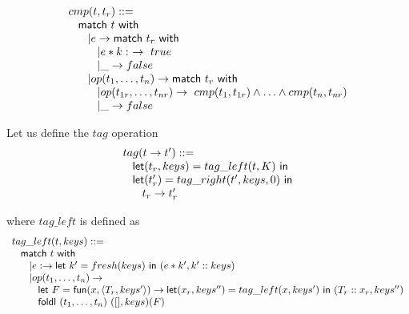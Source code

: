 \documentclass{article}[12pt,a4paper]
\theoremstyle{definition}
\begin{document}
\[
  \begin{array}{l}
  cmp(t,t_r) ::=\\
    \hspace{2ex}\mathsf{match}~t~\mathsf{with}\\
    \hspace{4ex}| e \rightarrow \mathsf{match}~t_r~\mathsf{with}\\
    \hspace{6ex}| e*k: ~\rightarrow~true\\
    \hspace{6ex}| \_ \rightarrow false\\
    \hspace{4ex}| op(t_1,\ldots,t_n) \rightarrow \mathsf{match}~t_r~\mathsf{with}\\
    \hspace{6ex}| op(t_{1r},\ldots,t_{nr})\rightarrow~cmp(t_1,t_{1r}) \wedge\ldots\wedge cmp(t_n,t_{nr})\\
    \hspace{6ex}| \_ \rightarrow false

  \end{array}
\]

Let us define the $tag$ operation
\[
  \begin{array}{l}
    tag(t\rightarrow t') ::=\\
    \hspace{2ex}\mathsf{let} (t_r, keys) = tag\_left(t, K)~\mathsf{in}\\
    \hspace{2ex}\mathsf{let} (t_r') = tag\_right(t', keys, 0)~\mathsf{in}\\
    \hspace{4ex}t_r \rightarrow t'_r
  \end{array}
\]

where $tag\_left$ is defined as
\[
  \begin{array}{l}
    tag\_left(t, keys) ::=\\
    \hspace{2ex}\mathsf{match}~t~\mathsf{with}\\
    \hspace{4ex}| e: \rightarrow \mathsf{let}~k'=fresh(keys)~\mathsf{in}~
    (e*k',k'::keys)\\
    \hspace{4ex}| op(t_1,\ldots,t_n) \rightarrow \\
    \hspace{6ex} \mathsf{let}~F=\mathsf{fun}(x,\langle T_r, keys'\rangle) \rightarrow \mathsf{let}(x_r,keys'')=tag\_left(x, keys')~\mathsf{in}~(T_r::x_r, keys'')\\
    \hspace{6ex} \mathsf{foldl}~(t_1,\ldots,t_n)~([],keys)(F)
  \end{array}
\]
\end{document}
